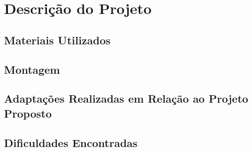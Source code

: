 \chapter{Descrição do Projeto}\label{descricao}

\section{Materiais Utilizados}

\section{Montagem}
\label{sec:montagem}

\section{Adaptações Realizadas em Relação ao Projeto Proposto}%
\label{sec:adaptacoes}

\section{Dificuldades Encontradas}%
\label{sec:dificuldades}

